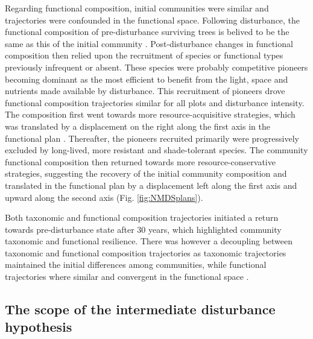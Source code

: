 \documentclass[fleqn,10pt]{ArtEcoFoG} %
\begin{document}
Regarding functional composition, initial communities were similar and
trajectories were confounded in the functional space. Following
disturbance, the functional composition of pre-disturbance surviving
trees is belived to be the same as this of the initial community
\citep{Herault2018}. Post-disturbance changes in functional composition
then relied upon the recruitment of species or functional types
previously infrequent or absent. These species were probably competitive
pioneers becoming dominant as the most efficient to benefit from the
light, space and nutrients made available by disturbance. This
recruitment of pioneers drove functional composition trajectories
similar for all plots and disturbance intensity. The composition first
went towards more resource-acquisitive strategies, which was translated
by a displacement on the right along the first axis in the functional
plan \citep{Westoby1998, Wright2004, Reich2014}. Thereafter, the
pioneers recruited primarily were progressively excluded by long-lived,
more resistant and shade-tolerant species. The community functional
composition then returned towards more resource-conservative strategies,
suggesting the recovery of the initial community composition and
translated in the functional plan by a displacement left along the first
axis and upward along the second axis (Fig. \ref{fig:NMDSplans}).

Both taxonomic and functional composition trajectories initiated a
return towards pre-disturbance state after 30 years, which highlighted
community taxonomic and functional resilience. There was however a
decoupling between taxonomic and functional composition trajectories as
taxonomic trajectories maintained the initial differences among
communities, while functional trajectories where similar and convergent
in the functional space \citep{Fukami2005}.

\subsection{The scope of the intermediate disturbance
hypothesis}\label{the-scope-of-the-intermediate-disturbance-hypothesis}
\end{document}
